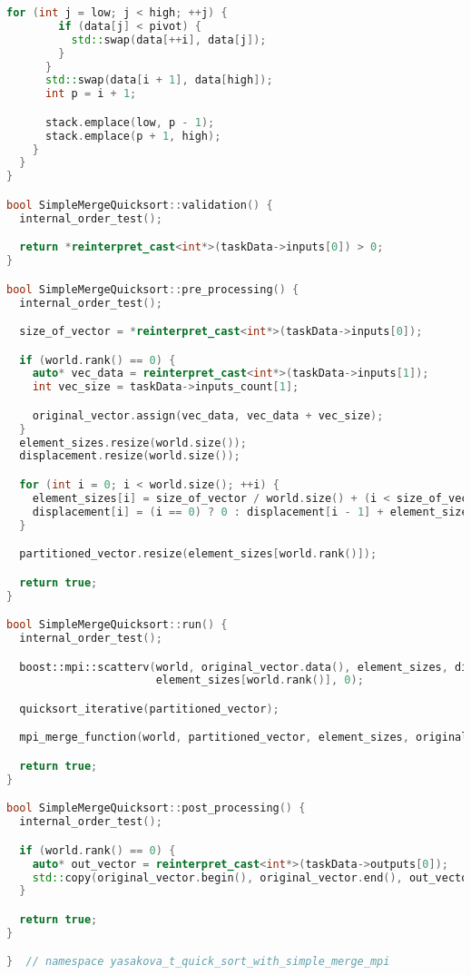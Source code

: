 \documentclass[a4paper,12pt]{article}
\begin{document}
\begin{lstlisting}[language=C++,caption={Код программы}]
      for (int j = low; j < high; ++j) {
        if (data[j] < pivot) {
          std::swap(data[++i], data[j]);
        }
      }
      std::swap(data[i + 1], data[high]);
      int p = i + 1;

      stack.emplace(low, p - 1);
      stack.emplace(p + 1, high);
    }
  }
}

bool SimpleMergeQuicksort::validation() {
  internal_order_test();

  return *reinterpret_cast<int*>(taskData->inputs[0]) > 0;
}

bool SimpleMergeQuicksort::pre_processing() {
  internal_order_test();

  size_of_vector = *reinterpret_cast<int*>(taskData->inputs[0]);

  if (world.rank() == 0) {
    auto* vec_data = reinterpret_cast<int*>(taskData->inputs[1]);
    int vec_size = taskData->inputs_count[1];

    original_vector.assign(vec_data, vec_data + vec_size);
  }
  element_sizes.resize(world.size());
  displacement.resize(world.size());

  for (int i = 0; i < world.size(); ++i) {
    element_sizes[i] = size_of_vector / world.size() + (i < size_of_vector % world.size() ? 1 : 0);
    displacement[i] = (i == 0) ? 0 : displacement[i - 1] + element_sizes[i - 1];
  }

  partitioned_vector.resize(element_sizes[world.rank()]);

  return true;
}

bool SimpleMergeQuicksort::run() {
  internal_order_test();

  boost::mpi::scatterv(world, original_vector.data(), element_sizes, displacement, partitioned_vector.data(),
                       element_sizes[world.rank()], 0);

  quicksort_iterative(partitioned_vector);

  mpi_merge_function(world, partitioned_vector, element_sizes, original_vector);

  return true;
}

bool SimpleMergeQuicksort::post_processing() {
  internal_order_test();

  if (world.rank() == 0) {
    auto* out_vector = reinterpret_cast<int*>(taskData->outputs[0]);
    std::copy(original_vector.begin(), original_vector.end(), out_vector);
  }

  return true;
}

}  // namespace yasakova_t_quick_sort_with_simple_merge_mpi
\end{lstlisting}
\end{document}
